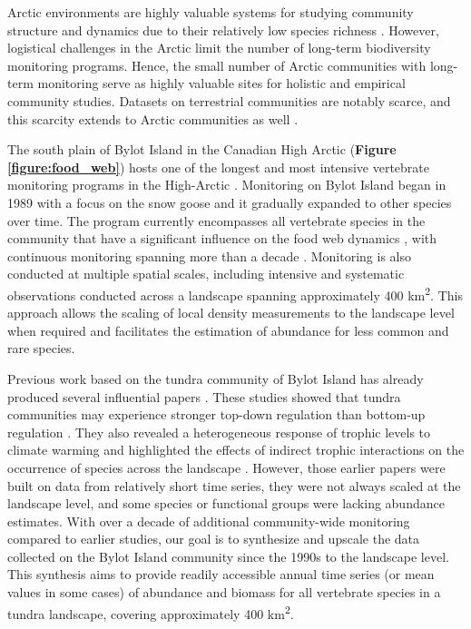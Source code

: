 \documentclass[a4paper,twoside,12pt]{article}
\begin{document}
Arctic environments are highly valuable systems for studying community structure and dynamics due to their relatively low species richness \citep{payer2013, legagneux2014}. However, logistical challenges in the Arctic limit the number of long-term biodiversity monitoring programs. Hence, the small number of Arctic communities with long-term monitoring serve as highly valuable sites for holistic and empirical community studies. Datasets on terrestrial communities are notably scarce, and this scarcity extends to Arctic communities as well \citep{ims2013}.

The south plain of Bylot Island in the Canadian High Arctic (\textbf{Figure \ref{figure:food_web}}) hosts one of the longest and most intensive vertebrate monitoring programs in the High-Arctic \citep{gauthier2024a}. Monitoring on Bylot Island began in 1989 with a focus on the snow goose and it gradually expanded to other species over time. The program currently encompasses all vertebrate species in the community that have a significant influence on the food web dynamics \citep{gauthier2011, legagneux2012}, with continuous monitoring spanning more than a decade \citep{gauthier2024a}. Monitoring is also conducted at multiple spatial scales, including intensive and systematic observations conducted across a landscape spanning approximately 400 km\textsuperscript{2}. This approach allows the scaling of local density measurements to the landscape level when required and facilitates the estimation of abundance for less common and rare species.

Previous work based on the tundra community of Bylot Island  has already produced several influential papers \citep{gauthier2011, legagneux2012, legagneux2014,hutchison2020, duchesne2021, gauthier2024b}. These studies showed that tundra communities may experience stronger top-down regulation than bottom-up regulation \citep{legagneux2012, legagneux2014}. They also revealed a heterogeneous response of trophic levels to climate warming \citep{gauthier2013} and highlighted the effects of indirect trophic interactions on the occurrence of species across the landscape \citep{duchesne2021}. However, those earlier papers were built on data from relatively short time series, they were not always scaled at the landscape level, and some species or functional groups were lacking abundance estimates. With over a decade of additional community-wide monitoring compared to earlier studies, our goal is to synthesize and upscale the data collected on the Bylot Island community since the 1990s to the landscape level. This synthesis aims to provide readily accessible annual time series (or mean values in some cases) of abundance and biomass for all vertebrate species in a tundra landscape, covering approximately 400 km\textsuperscript{2}. 
\end{document}
